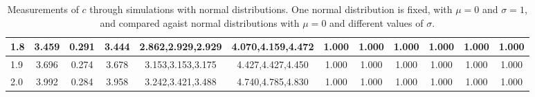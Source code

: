 \begin{table*}[h!]
\begin{center}
\begin{tabular}{| l | c | c | c | c | c | c | c | c | c | c | c |}
1.8 & 3.459 & 0.291 & 3.444 & 2.862,2.929,2.929 & 4.070,4.159,4.472  & 1.000  & 1.000  & 1.000  & 1.000  & 1.000  & 1.000 \\\hline
1.9 & 3.696 & 0.274 & 3.678 & 3.153,3.153,3.175 & 4.427,4.427,4.450  & 1.000  & 1.000  & 1.000  & 1.000  & 1.000  & 1.000 \\\hline
2.0 & 3.992 & 0.284 & 3.958 & 3.242,3.421,3.488 & 4.740,4.785,4.830  & 1.000  & 1.000  & 1.000  & 1.000  & 1.000  & 1.000 \\\hline
\end{tabular}
\caption{Measurements of $c$ through simulations
with normal distributions.
One normal distribution is fixed, with $\mu=0$ and $\sigma=1$,
and compared agaist normal distributions with $\mu=0$
and different values of $\sigma$.}
\end{center}
\end{table*}